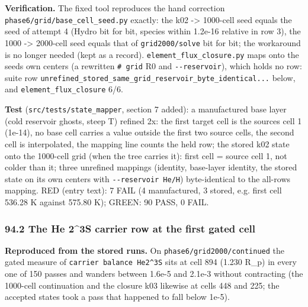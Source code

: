 \documentclass[english,a4paper]{my_memo}
\begin{document}
\textbf{Verification.} The fixed tool reproduces the hand correction
\texttt{phase6/grid/base\_cell\_seed.py} exactly: the k02 -\textgreater{} 1000-cell seed equals the
seed of attempt 4 (Hydro bit for bit, species within 1.2e-16 relative in row
3), the 1000 -\textgreater{} 2000-cell seed equals that of \texttt{grid2000/solve} bit for bit; the
workaround is no longer needed (kept as a record). \texttt{element\_flux\_closure.py}
maps onto the seed\textquotesingle s own centers (a rewritten \texttt{\#\ grid} R0 and \texttt{-\/-reservoir}),
which holds no row: suite row \texttt{unrefined\_stored\_same\_grid\_reservoir\_byte\_identical...}
below, and \texttt{element\_flux\_closure} 6/6.

\textbf{Test} (\texttt{src/tests/state\_mapper}, section 7 added): a manufactured base
layer (cold reservoir ghosts, steep T) refined 2x: the first target cell is
the source\textquotesingle s cell 1 (1e-14), no base cell carries a value outside the first
two source cells, the second cell is interpolated, the mapping line counts
the held row; the stored k02 state onto the 1000-cell grid (when the tree
carries it): first cell = source cell 1, not colder than it; three unrefined
mappings (identity, base-layer identity, the stored state on its own centers
with \texttt{-\/-reservoir\ He/H}) byte-identical to the all-rows mapping. RED (entry
text): 7 FAIL (4 manufactured, 3 stored, e.g. first cell 536.28 K against
575.80 K); GREEN: 90 PASS, 0 FAIL.

\subsubsection{94.2 The He 2\^{}3S carrier row at the first gated cell}\label{942-the-he-23s-carrier-row-at-the-first-gated-cell}

\textbf{Reproduced from the stored runs.} On \texttt{phase6/grid2000/continued} the gated
measure of \texttt{carrier\ balance\ He2\^{}3S} sits at cell 894 (1.230 R\_p) in every one
of 150 passes and wanders between 1.6e-5 and 2.1e-3 without contracting (the
1000-cell continuation and the closure k03 likewise at cells 448 and 225; the
accepted states took a pass that happened to fall below 1e-5).
\end{document}
